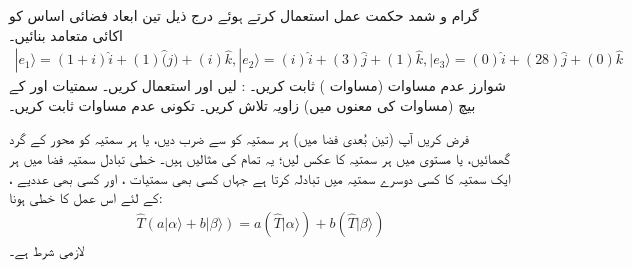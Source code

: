 گرام و شمد حکمت عمل استعمال کرتے ہوئے درج ذیل   تین ابعاد فضائی  اساس کو  اکائی متعامد بنائیں۔
\begin{align*}
|e_1\rangle=(1+i)\hat{i}+(1)\hat(j)+(i)\hat{k}, |e_2\rangle=(i)\hat{i}+(3)\hat{j}+(1)\hat{k}, |e_3\rangle=(0)\hat{i}+(28)\hat{j}+(0)\hat{k}
\end{align*}
شوارز عدم مساوات (مساوات )   ثابت کریں۔ :  لیں  اور  استعمال کریں۔
سمتیات  اور  کے بیچ (مساوات  کی معنوں میں)  زاویہ تلاش کریں۔
تکونی عدم مساوات  ثابت کریں۔

فرض کریں آپ  (تین بُعدی  فضا میں)  ہر سمتیہ کو  سے ضرب دیں،  یا ہر سمتیہ کو محور  کے گرد  گھمائیں،  یا  مستوی میں ہر سمتیہ کا عکس لیں؛  یہ تمام   کی مثالیں ہیں۔ خطی تبادل    سمتیہ فضا میں ہر ایک سمتیہ کا کسی دوسرے سمتیہ  میں تبادلہ کرتا ہے  جہاں کسی بھی سمتیات  ،  اور کسی بھی  عددیے ،    کے لئے اس عمل کا  خطی ہونا:
\begin{align}
	\hat{T}(a|\alpha\rangle+b|\beta\rangle)=a(\hat{T}|\alpha\rangle)+b(\hat{T}|\beta\rangle)
\end{align}
 لازمی شرط  ہے۔

